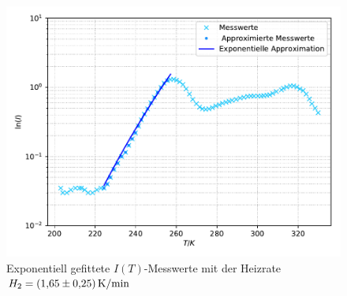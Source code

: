 \begin{figure}
  \centering
  \includegraphics[scale=0.75]{content/plot2.pdf}
  \caption{Exponentiell gefittete $I(T)$-Messwerte mit der Heizrate $H_2 = \SI{1.65 +- 0.25}{\kelvin\per\minute}$}
  \label{fig:plot2}
\end{figure}


